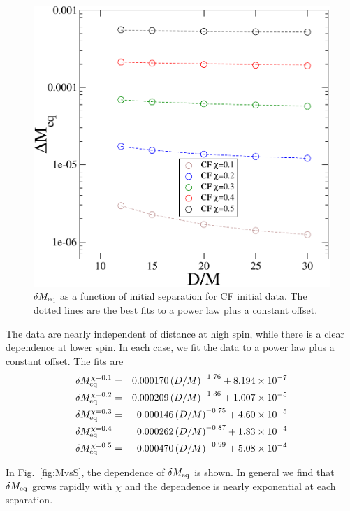 \documentclass[aps,prd,amsmath,floatfix,twocolumn,superscriptaddress,nofootinbib,showpacs]{revtex4-1}
\theoremstyle{plain}
\theoremstyle{definition}
\begin{document}
\begin{figure}[!htbp]
\includegraphics[scale=0.50]{MvsD2}
\caption{$\delta M_{\rm eq}$ as a function of initial separation for
  CF initial data. The dotted lines are the best fits to a power law
  plus a constant offset.}
\label{fig:MvsD}
\end{figure}

The data are nearly independent of distance at high spin, while there
is a clear dependence at lower spin. In each case, we fit the data to
a power law plus a constant offset. The fits are
\begin{eqnarray*}
\delta M_{\rm eq}^{\chi = 0.1} &=&
0.000170\left(D/M\right)^{-1.76}+8.194\times 10^{-7} \\
\delta M_{\rm eq}^{\chi = 0.2} &=&
0.000209\left(D/M\right)^{-1.36}+1.007\times 10^{-5} \\
\delta M_{\rm eq}^{\chi = 0.3} &=&
0.000146\left(D/M\right)^{-0.75}+4.60\times 10^{-5} \\
\delta M_{\rm eq}^{\chi = 0.4} &=&
0.000262\left(D/M\right)^{-0.87}+1.83\times 10^{-4} \\
\delta M_{\rm eq}^{\chi = 0.5} &=&
0.000470\left(D/M\right)^{-0.99}+5.08\times 10^{-4} 
\end{eqnarray*}

In Fig.~\ref{fig:MvsS}, the dependence of $\delta M_{\rm eq}$ is
shown. In general we find that $\delta M_{\rm eq}$ grows rapidly with
$\chi$ and the dependence is nearly exponential at each separation.
\end{document}
